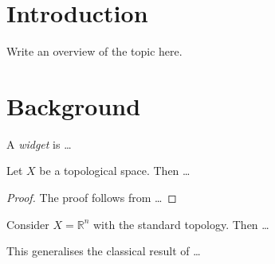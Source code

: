 \documentclass[11pt, a4paper]{article}
\title{\notestitle}
\author{\notesauthor}
\date{\notesdate}
\begin{document}
\maketitle
\tableofcontents
\newpage

\section{Introduction}

Write an overview of the topic here.

\section{Background}

\begin{definition}[Widget]
  A \emph{widget} is \dots
\end{definition}

\begin{theorem}\label{thm:main}
  Let $X$ be a topological space. Then \dots
\end{theorem}

\begin{proof}
  The proof follows from \dots
\end{proof}

\begin{example}
  Consider $X = \mathbb{R}^n$ with the standard topology. Then \dots
\end{example}

\begin{remark}
  This generalises the classical result of \dots
\end{remark}

\begin{center}
\end{center}


\end{document}
